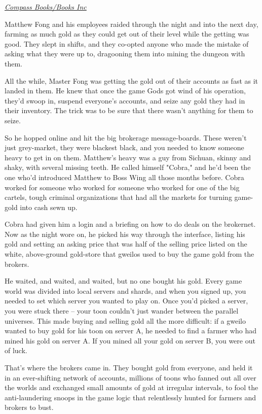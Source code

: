 \emph{\href{http://www.booksinc.net/NASApp/store/Product;jsessionid=abcF-ch09-pbU6m7ZRrLr?s=showproduct&isbn=0765322166}{Compass Books/Books Inc}}

Matthew Fong and his employees raided through the night and into
the next day, farming as much gold as they could get out of their
level while the getting was good. They slept in shifts, and they
co-opted anyone who made the mistake of asking what they were up
to, dragooning them into mining the dungeon with them.

All the while, Master Fong was getting the gold out of their
accounts as fast as it landed in them. He knew that once the game
Gods got wind of his operation, they'd swoop in, suspend everyone's
accounts, and seize any gold they had in their inventory. The trick
was to be sure that there wasn't anything for them to seize.

So he hopped online and hit the big brokerage message-boards. These
weren't just grey-market, they were blackest black, and you needed
to know someone heavy to get in on them. Matthew's heavy was a guy
from Sichuan, skinny and shaky, with several missing teeth. He
called himself "Cobra," and he'd been the one who'd introduced
Matthew to Boss Wing all those months before. Cobra worked for
someone who worked for someone who worked for one of the big
cartels, tough criminal organizations that had all the markets for
turning game-gold into cash sewn up.

Cobra had given him a login and a briefing on how to do deals on
the brokernet. Now as the night wore on, he picked his way through
the interface, listing his gold and setting an asking price that
was half of the selling price listed on the white, above-ground
gold-store that gweilos used to buy the game gold from the
brokers.

He waited, and waited, and waited, but no one bought his gold.
Every game world was divided into local servers and shards, and
when you signed up, you needed to set which server you wanted to
play on. Once you'd picked a server, you were stuck there -- your
toon couldn't just wander between the parallel universes. This made
buying and selling gold all the more difficult: if a gweilo wanted
to buy gold for his toon on server A, he needed to find a farmer
who had mined his gold on server A. If you mined all your gold on
server B, you were out of luck.

That's where the brokers came in. They bought gold from everyone,
and held it in an ever-shifting network of accounts, millions of
toons who fanned out all over the worlds and exchanged small
amounts of gold at irregular intervals, to fool the anti-laundering
snoops in the game logic that relentlessly hunted for farmers and
brokers to bust.

